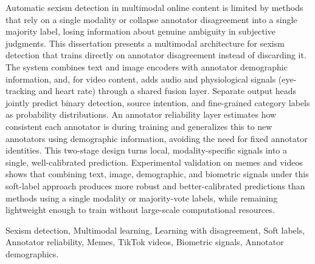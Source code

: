 
Automatic sexism detection in multimodal online content is limited by methods that rely on a single modality or collapse annotator disagreement into a single majority label, losing information about genuine ambiguity in subjective judgments. This dissertation presents a multimodal architecture for sexism detection that trains directly on annotator disagreement instead of discarding it. The system combines text and image encoders with annotator demographic information, and, for video content, adds audio and physiological signals (eye-tracking and heart rate) through a shared fusion layer. Separate output heads jointly predict binary detection, source intention, and fine-grained category labels as probability distributions. An annotator reliability layer estimates how consistent each annotator is during training and generalizes this to new annotators using demographic information, avoiding the need for fixed annotator identities. This two-stage design turns local, modality-specific signals into a single, well-calibrated prediction. Experimental validation on memes and videos shows that combining text, image, demographic, and biometric signals under this soft-label approach produces more robust and better-calibrated predictions than methods using a single modality or majority-vote labels, while remaining lightweight enough to train without large-scale computational resources.

\mbox{}\linebreak
{} Sexism detection, Multimodal learning, Learning with disagreement, Soft labels, Annotator reliability, Memes, TikTok videos, Biometric signals, Annotator demographics.

